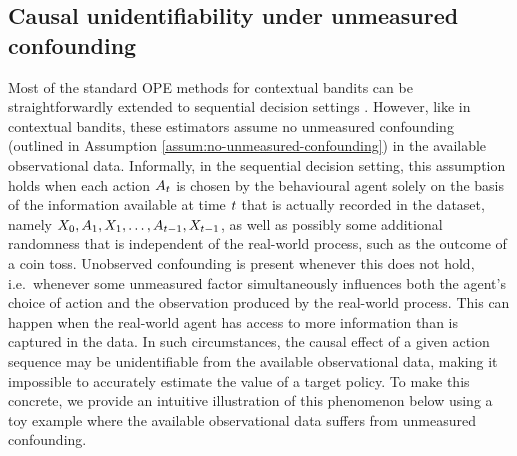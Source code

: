 \subsection{Causal unidentifiability under unmeasured confounding}\label{subsec:unmeasured-confounding}
Most of the standard OPE methods for contextual bandits can be straightforwardly extended to sequential decision settings \citep{uehara2022reviewoffpolicyevaluationreinforcement}. 
However, like in contextual bandits, these estimators assume no unmeasured confounding (outlined in Assumption \ref{assum:no-unmeasured-confounding}) in the available observational data. 
Informally, in the sequential decision setting, this assumption holds when each action $A_t$ is chosen by the behavioural agent solely on the basis of the information available at time $t$ that is actually recorded in the dataset, namely $X_{0}, A_1, X_1, \ldots, A_{t-1}, X_{t-1}$, as well as possibly some additional randomness that is independent of the real-world process, such as the outcome of a coin toss. 
Unobserved confounding is present whenever this does not hold, i.e.\ whenever some unmeasured factor simultaneously influences both the agent's choice of action and the observation produced by the real-world process.
This can happen when the real-world agent has access to more information than is captured in the data. 
In such circumstances, the causal effect of a given action sequence may be unidentifiable from the available observational data, making it impossible to accurately estimate the value of a target policy.
To make this concrete, we provide an intuitive illustration of this phenomenon below using a toy example where the available observational data suffers from unmeasured confounding.


